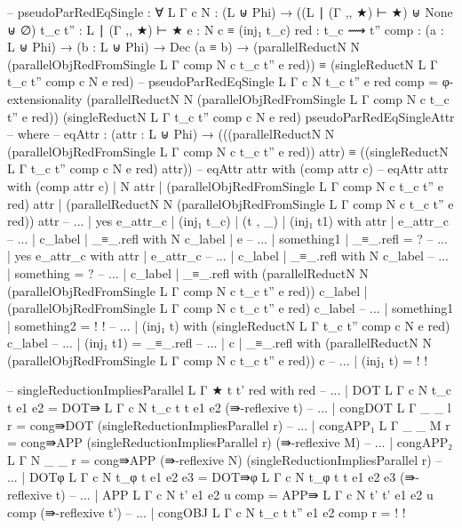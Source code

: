 {\begin{code}
  -- pseudoParRedEqSingle : ∀ {L Γ c} {N : (L ⊎ Phi) → ((L ∣ (Γ ,, ★) ⊢ ★) ⊎ None ⊎ ∅)} {t_c t'' : L ∣ (Γ ,, ★) ⊢ ★} {e : N c ≡ (inj₁ t_c)} {red : t_c ⟿ t''} {comp : (a : L ⊎ Phi) → (b : L ⊎ Phi) → Dec (a ≡ b)} → (parallelReductN N (parallelObjRedFromSingle {L} {Γ} {comp} N c t_c t'' e red)) ≡ (singleReductN {L} {Γ} {t_c} {t''} {comp} c N e red)
  -- pseudoParRedEqSingle {L} {Γ} {c} {N} {t_c} {t''} {e} {red} {comp} = φ-extensionality (parallelReductN N (parallelObjRedFromSingle {L} {Γ} {comp} N c t_c t'' e red)) (singleReductN {L} {Γ} {t_c} {t''} {comp} c N e red) pseudoParRedEqSingleAttr -- where
    -- eqAttr : (attr : L ⊎ Phi) → (((parallelReductN N (parallelObjRedFromSingle {L} {Γ} {comp} N c t_c t'' e red)) attr) ≡ ((singleReductN {L} {Γ} {t_c} {t''} {comp} c N e red) attr))
    -- eqAttr attr with (comp attr c)
    -- eqAttr attr with (comp attr c) | N attr | (parallelObjRedFromSingle {L} {Γ} {comp} N c t_c t'' e red) attr | (parallelReductN N (parallelObjRedFromSingle {L} {Γ} {comp} N c t_c t'' e red)) attr
    -- ... | yes e_attr_c | (inj₁ t_c) | (t , _) | (inj₁ t1) with attr | e_attr_c
    -- ...   | c_label | _≡_.refl with N c_label | e
    -- ...     | something1 | _≡_.refl = ?
    -- ... | yes e_attr_c with attr | e_attr_c
    -- ...   | c_label | _≡_.refl with N c_label
    -- ...     | something = ?
    -- ...   | c_label | _≡_.refl with (parallelReductN N (parallelObjRedFromSingle {L} {Γ} {comp} N c t_c t'' e red)) c_label | (parallelObjRedFromSingle {L} {Γ} {comp} N c t_c t'' e red) c_label
    -- ...     | something1 | something2 = {!   !}
    -- ...     | (inj₁ t) with (singleReductN {L} {Γ} {t_c} {t''} {comp} c N e red) c_label
    -- ...       | (inj₁ t1) = _≡_.refl
    -- ...   | c | _≡_.refl with (parallelReductN N (parallelObjRedFromSingle {L} {Γ} {comp} N c t_c t'' e red)) c
    -- ...     | (inj₁ t) = {!   !}

  -- singleReductionImpliesParallel {L} {Γ} {★} {t} {t'} red with red
  -- ... | DOT {L} {Γ} {c} {N} {t_c} {t} {e1} {e2} = DOT⇛ {L} {Γ} {c} {N} {t_c} {t} {t} {e1} {e2} (⇛-reflexive t)
  -- ... | congDOT {L} {Γ} {_} {_} {l} r = cong⇛DOT (singleReductionImpliesParallel r)
  -- ... | congAPP₁ {L} {Γ} {_} {_} {M} r = cong⇛APP (singleReductionImpliesParallel r) (⇛-reflexive M)
  -- ... | congAPP₂ {L} {Γ} {N} {_} {_} r = cong⇛APP (⇛-reflexive N) (singleReductionImpliesParallel r)
  -- ... | DOTφ {L} {Γ} {c} {N} {t_φ} {t} {e1} {e2} {e3} = DOT⇛φ {L} {Γ} {c} {N} {t_φ} {t} {t} {e1} {e2} {e3} (⇛-reflexive t)
  -- ... | APP {L} {Γ} {c} {N} {t'} {e1} {e2} {u} comp = APP⇛ {L} {Γ} {c} {N} {t'} {t'} {e1} {e2} {u} {comp} (⇛-reflexive t')
  -- ... | congOBJ {L} {Γ} {c} {N} {t_c} {t} {t''} {e1} {e2} {comp} r = {!   !}


\end{code}}
